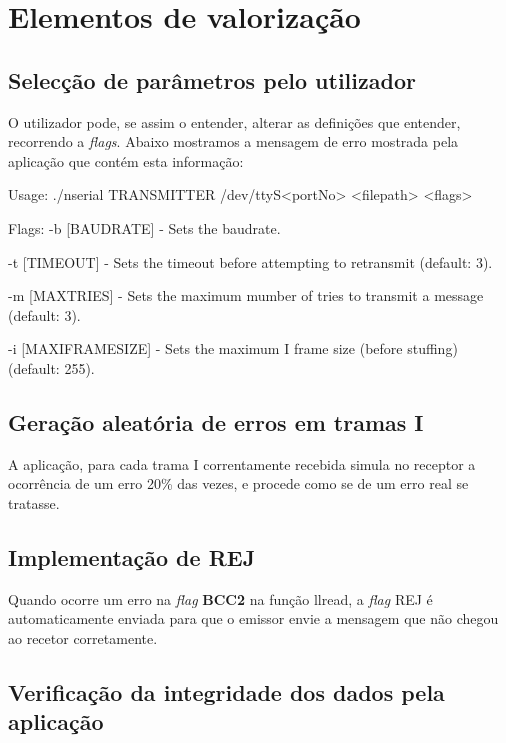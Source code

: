 \documentclass[11pt,a4paper,reqno]{article}
\numberwithin{equation}{section}
\begin{document}
\section{Elementos de valorização}

\subsection{Selecção de parâmetros pelo utilizador}

O utilizador pode, se assim o entender, alterar as definições que entender, recorrendo a \textit{flags}. Abaixo mostramos a mensagem de erro mostrada pela aplicação que contém esta informação:

Usage: ./nserial TRANSMITTER /dev/ttyS<portNo> <filepath> <flags>

Flags: -b [BAUDRATE] - Sets the baudrate.

       -t [TIMEOUT] - Sets the timeout before attempting to retransmit (default: 3).
       
       -m [MAXTRIES] - Sets the maximum mumber of tries to transmit a message (default: 3).
       
       -i [MAX\textunderscore I\textunderscore FRAME\textunderscore SIZE] - Sets the maximum I frame size (before stuffing) (default: 255).

\subsection{Geração aleatória de erros em tramas I}

A aplicação, para cada trama I correntamente recebida simula no receptor a ocorrência de um erro 20\% das vezes, e procede como se de um erro real se tratasse.

\subsection{Implementação de REJ}

Quando ocorre um erro na \textit{flag} \textbf{BCC2} na função llread, a \textit{flag} REJ é automaticamente enviada para que o emissor envie a mensagem que não chegou ao recetor corretamente.

\subsection{Verificação da integridade dos dados pela aplicação}
\end{document}
